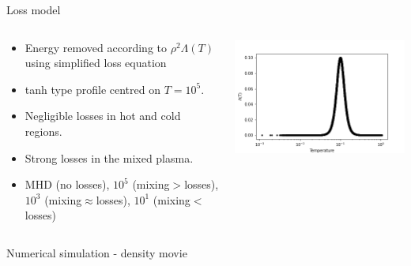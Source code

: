 \documentclass[10pt,aspectratio=169,usenames,dvipsnames]{beamer}
\begin{document}
\begin{frame}{Loss model}
\begin{columns}
\begin{column}{0.55\textwidth}
\begin{itemize}
    \item Energy removed according to $\rho^2 \Lambda (T)$ using simplified loss equation
    \item tanh type profile centred on $T=10^5$.
    \item Negligible losses in hot and cold regions.
    \item Strong losses in the mixed plasma.
    \item MHD (no losses), $10^5$ (mixing$>$losses), $10^3$ (mixing$\approx$losses), $10^1$ (mixing$<$losses)
\end{itemize}
\end{column}
\begin{column}{0.45\textwidth}
\includegraphics[width=0.95\linewidth]{2023Dundee/Figures/lossprof.png}
\end{column}
\end{columns}
\end{frame}

\begin{frame}{Numerical simulation - density movie}
\end{frame}
\end{document}
